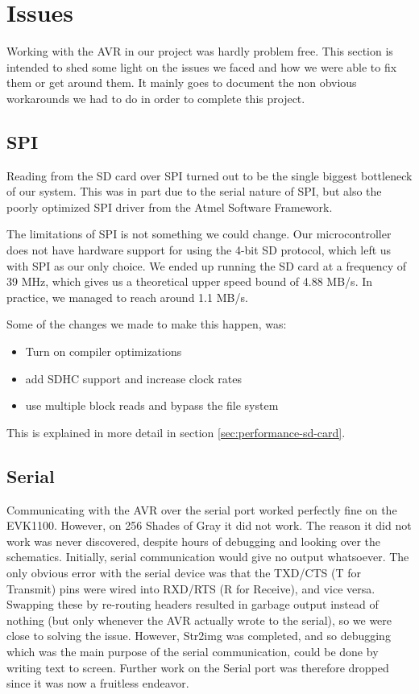 \section{Issues}

Working with the AVR in our project was hardly problem free. This section is intended to shed some light on the issues we faced and how we were able to fix them or get around them. It mainly goes to document the non obvious workarounds we had to do in order to complete this project.

\subsection{SPI}
\label{sec:avr-spi-issues}
Reading from the \ac{SD} card over \ac{SPI} turned out to be the single biggest
bottleneck of our system. This was in part due to the serial nature of \ac{SPI},
but also the poorly optimized \ac{SPI} driver from the Atmel Software Framework.

The limitations of \ac{SPI} is not something we could change. Our
microcontroller does not have hardware support for using the 4-bit \ac{SD}
protocol, which left us with \ac{SPI} as our only choice. We ended up running
the \ac{SD} card at a frequency of 39 MHz, which gives us a theoretical upper
speed bound of 4.88 MB/s. In practice, we managed to reach around 1.1 MB/s.

Some of the changes we made to make this happen, was: \vspace{-1.0em}
\begin{itemize}
  \item Turn on compiler optimizations \vspace{-1.0em}
  \item add SDHC support and increase clock rates\vspace{-1.0em}
  \item use multiple block reads and bypass the file system
\end{itemize}

This is explained in more detail in section \ref{sec:performance-sd-card}.

\subsection{Serial}
\label{sec:avr-serial-issues}
Communicating with the AVR over the serial port worked perfectly fine on the
EVK1100. However, on 256 Shades of Gray it did not work. The reason it did not
work was never discovered, despite hours of debugging and looking over the
schematics. Initially, serial communication would give no output whatsoever. The
only obvious error with the serial device was that the TXD/CTS (T for Transmit)
pins were wired into RXD/RTS (R for Receive), and vice versa. Swapping these by
re-routing headers resulted in garbage output instead of nothing (but only
whenever the AVR actually wrote to the serial), so we were close to solving the
issue. However, Str2img was completed, and so debugging which was the main
purpose of the serial communication, could be done by writing text to
screen. Further work on the Serial port was therefore dropped since it was now a
fruitless endeavor.

